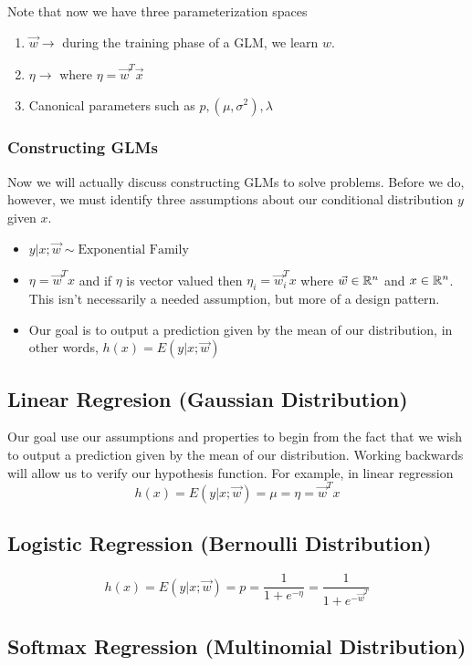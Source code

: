 \documentclass[12pt]{scrartcl}
\begin{document}
Note that now we have three parameterization spaces
\begin{enumerate}
    \item $\vec{w} \to $ during the training phase of a GLM, we learn $w$.
    \item $\eta \to $ where $\eta = \vec{w}^T\vec{x}$
    \item Canonical parameters such as $p, (\mu, \sigma^2), \lambda$
\end{enumerate}

\subsubsection{Constructing GLMs}

Now we will actually discuss constructing GLMs to solve problems. Before we do,
however, we must identify three assumptions about our conditional distribution
$y$ given $x$.
\begin{itemize}
    \item $y | x; \vec{w} \sim \text{Exponential Family}$
    \item $\eta = \vec{w}^Tx$ and if $\eta$ is vector valued then $\eta_i = \vec{w}_i^Tx$ where $\vec{w} \in \mathbb R^n$ and $x \in \mathbb R^n$. This isn't necessarily a needed assumption, but more of a design pattern.
    \item Our goal is to output a prediction given by the mean of our distribution, in
          other words, $h(x) = E(y | x; \vec{w})$
\end{itemize}

\subsection{Linear Regresion (Gaussian Distribution)}

Our goal use our assumptions and properties to begin from the fact that we wish
to output a prediction given by the mean of our distribution. Working backwards
will allow us to verify our hypothesis function. For example, in linear
regression
\[h(x) = E(y | x; \vec{w}) = \mu = \eta = \vec{w}^Tx\]

\subsection{Logistic Regression (Bernoulli Distribution)}
\[h(x) = E(y | x; \vec{w}) = p = \frac{1}{1 + e^{-\eta}} = \frac{1}{1 + e^{-\vec{w}^T}}\]

\subsection{Softmax Regression (Multinomial Distribution)}
\end{document}
